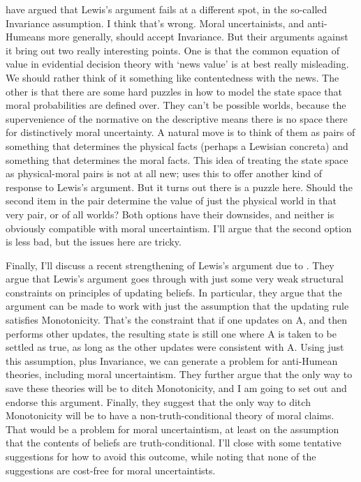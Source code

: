 \citet{Bradley2016} have argued that Lewis's argument fails at a different spot, in the so-called Invariance assumption. I think that's wrong. Moral uncertainists, and anti-Humeans more generally, should accept Invariance. But their arguments against it bring out two really interesting points. One is that the common equation of value in evidential decision theory with `news value' is at best really misleading. We should rather think of it something like contentedness with the news. The other is that there are some hard puzzles in how to model the state space that moral probabilities are defined over. They can't be possible worlds, because the supervenience of the normative on the descriptive means there is no space there for distinctively moral uncertainty. A natural move is to think of them as pairs of something that determines the physical facts (perhaps a Lewisian concreta) and something that determines the moral facts. This idea of treating the state space as physical-moral pairs is not at all new; \citet{Bradley2009} uses this to offer another kind of response to Lewis's argument. But it turns out there is a puzzle here. Should the second item in the pair determine the value of just the physical world in that very pair, or of all worlds? Both options have their downsides, and neither is obviously compatible with moral uncertaintism. I'll argue that the second option is less bad, but the issues here are tricky.

Finally, I'll discuss a recent strengthening of Lewis's argument due to \citet{Russell2016}. They argue that Lewis's argument goes through with just some very weak structural constraints on principles of updating beliefs. In particular, they argue that the argument can be made to work with just the assumption that the updating rule satisfies Monotonicity. That's the constraint that if one updates on A, and then performs other updates, the resulting state is still one where A is taken to be settled as true, as long as the other updates were consistent with A. Using just this assumption, plus Invariance, we can generate a problem for anti-Humean theories, including moral uncertaintism. They further argue that the only way to save these theories will be to ditch Monotonicity, and I am going to set out and endorse this argument. Finally, they suggest that the only way to ditch Monotonicity will be to have a non-truth-conditional theory of moral claims. That would be a problem for moral uncertaintism, at least on the assumption that the contents of beliefs are truth-conditional. I'll close with some tentative suggestions for how to avoid this outcome, while noting that none of the suggestions are cost-free for moral uncertaintists.

